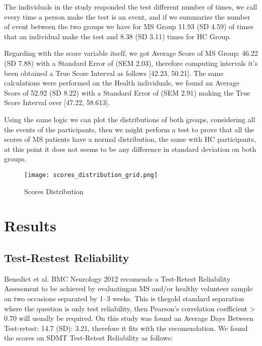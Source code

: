 \documentclass[letterpaper, 10 pt, conference]{ieeeconf}
\begin{document}
The individuals in the study responded the test different number of times, we call every time a person make the test is an event, and if we summarize the number of event between the two groups we have for MS Group 11.93 (SD 4.59) of times that an individual make the test and 8.38 (SD 3.11) times for HC Group.

Regarding with the score variable itself, we got Average Score of MS Group: 46.22 (SD 7.88) with a Standard Error of (SEM 2.03), therefore computing intervals it's been obtained a True Score Interval as follows [42.23, 50.21]. The same calculations were performed on the Health individuals, we found an Average Score of 52.92 (SD 8.22)
with a Standard Error of (SEM 2.91) making the True Score Interval over [47.22, 58.613].

Using the same logic we can plot the distributions of both groups, considering all the events of the participants, then  we might perform a test to prove that all the scores of MS patients have a normal distribution, the same with HC participants, at this point it does not seems to be any difference in standard deviation on both groups.

\begin{figure}[ht]
\texttt{[image: scores\_distribution\_grid.png]}
\caption{Scores Distribution}
\label{tab:scores}
\end{figure}

\vspace{2mm}


\section{Results}
\vspace{2mm}

\subsection{Test-Restest Reliability}
\vspace{2mm}

Benedict et al. BMC Neurology 2012 recomends a Test-Retest Reliability Assessment to be achieved by evaluatingan MS and/or healthy volunteer sample on two occasions separated by 1–3 weeks. This is thegold standard separation where the question is only test reliability, then Pearson’s correlation coefficient > 0.70 will usually be required. On this study was found an Average Days Between Test-retest: 14.7 (SD): 3.21, therefore it fits with the recomendation. We found the scores on SDMT Test-Retest Reliability as follows:
\end{document}
